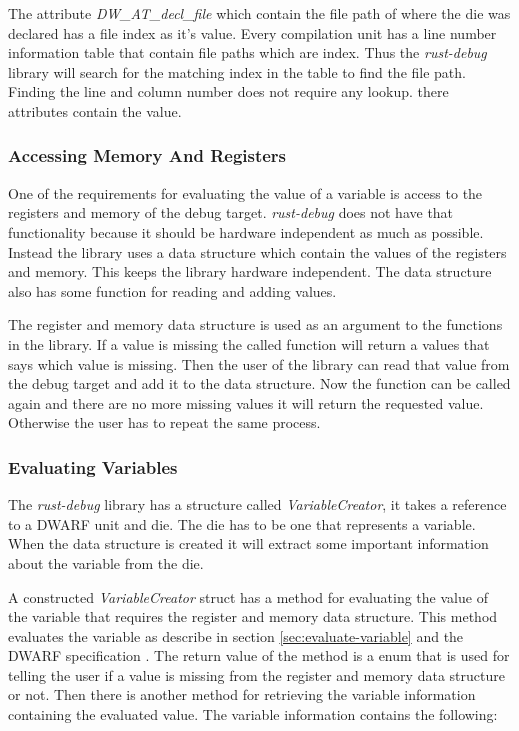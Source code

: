 The attribute  \emph{DW\_AT\_decl\_file} which contain the file path of where the \gls{die} was declared has a file index as it's value.
Every compilation unit has a line number information table that contain file paths which are index.
Thus the \emph{rust-debug} library will search for the matching index in the table to find the file path.
Finding the line and column number does not require any lookup. there attributes contain the value.


\subsubsection{Accessing Memory And Registers}
One of the requirements for evaluating the value of a variable is access to the registers and memory of the debug target.
\emph{rust-debug} does not have that functionality because it should be hardware independent as much as possible.
Instead the library uses a data structure which contain the values of the registers and memory.
This keeps the library hardware independent.
The data structure also has some function for reading and adding values.


The register and memory data structure is used as an argument to the functions in the library.
If a value is missing the called function will return a values that says which value is missing.
Then the user of the library can read that value from the debug target and add it to the data structure.
Now the function can be called again and there are no more missing values it will return the requested value.
Otherwise the user has to repeat the same process.


\subsubsection{Evaluating Variables} \label{sec:ievalvar}
The \emph{rust-debug} library has a structure called \emph{VariableCreator}, it takes a reference to a \gls{DWARF} unit and \gls{die}.
The \gls{die} has to be one that represents a variable.
When the data structure is created it will extract some important information about the variable from the \gls{die}.


A constructed \emph{VariableCreator} struct has a method for evaluating the value of the variable that requires the register and memory data structure.
This method evaluates the variable as describe in section \ref{sec:evaluate-variable} and the \gls{DWARF} specification \cite{dwarf}.
The return value of the method is a enum that is used for telling the user if a value is missing from the register and memory data structure or not.
Then there is another method for retrieving the variable information containing the evaluated value.
The variable information contains the following:

